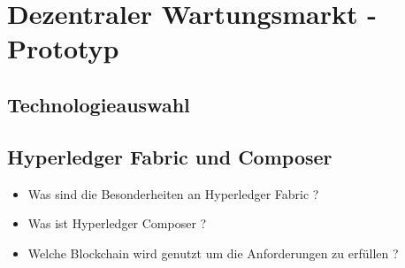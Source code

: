 \chapter{Dezentraler Wartungsmarkt - Prototyp}
\label{cha:wartungsmarkt-impl}

\section{Technologieauswahl}


\section{Hyperledger Fabric und Composer}


\begin{itemize} 
    \item Was sind die Besonderheiten an Hyperledger Fabric ?
    \item Was ist Hyperledger Composer ?
\end{itemize}


\begin{itemize}
    \item Welche Blockchain wird genutzt um die Anforderungen zu erfüllen ?
\end{itemize}

